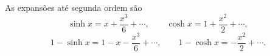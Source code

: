 As expansões até segunda ordem são
\[
\sinh x = x + \frac{x^{3}}{6} + \cdots,
\qquad
\cosh x = 1 + \frac{x^{2}}{2} + \cdots,
\]
\[
1-\sinh x = 1 - x - \frac{x^{3}}{6} + \cdots,
\qquad
1-\cosh x = -\frac{x^{2}}{2} + \cdots.
\]